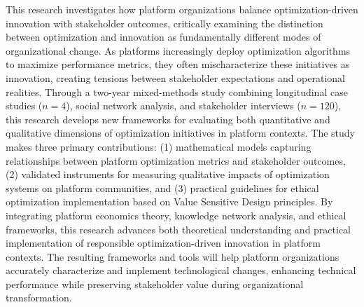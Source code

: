 This research investigates how platform organizations balance optimization-driven innovation with stakeholder outcomes, critically examining the distinction between optimization and innovation as fundamentally different modes of organizational change. As platforms increasingly deploy optimization algorithms to maximize performance metrics, they often mischaracterize these initiatives as innovation, creating tensions between stakeholder expectations and operational realities. Through a two-year mixed-methods study combining longitudinal case studies ($n=4$), social network analysis, and stakeholder interviews ($n=120$), this research develops new frameworks for evaluating both quantitative and qualitative dimensions of optimization initiatives in platform contexts. The study makes three primary contributions: (1) mathematical models capturing relationships between platform optimization metrics and stakeholder outcomes, (2) validated instruments for measuring qualitative impacts of optimization systems on platform communities, and (3) practical guidelines for ethical optimization implementation based on Value Sensitive Design principles. By integrating platform economics theory, knowledge network analysis, and ethical frameworks, this research advances both theoretical understanding and practical implementation of responsible optimization-driven innovation in platform contexts. The resulting frameworks and tools will help platform organizations accurately characterize and implement technological changes, enhancing technical performance while preserving stakeholder value during organizational transformation. 
